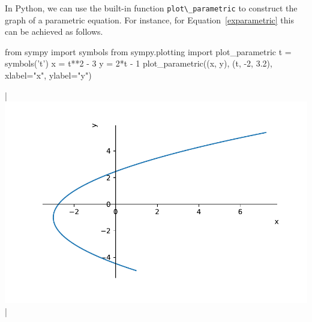 \ifpython
In Python, we can use the built-in function \lstinline{plot\_parametric} to construct the graph of a parametric equation. For instance, for Equation~\eqref{exparametric} this can be achieved as follows. 
\begin{pyin}
from sympy import symbols
from sympy.plotting import plot_parametric
t = symbols('t')
x = t**2 - 3
y = 2*t - 1
plot_parametric((x, y), (t, -2, 3.2), xlabel="x", ylabel="y")
\end{pyin}
\begin{pyout}
  |\includegraphics{figures/Parametric/fig_parametric_27_Python.pdf}|
\end{pyout}
\fi


